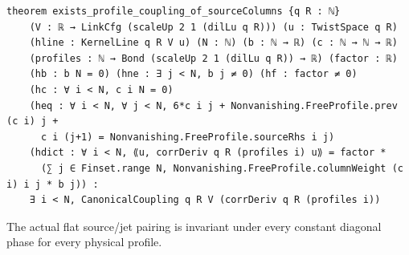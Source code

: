 \begin{theorem}[bp-329]
\begin{verbatim}
theorem exists_profile_coupling_of_sourceColumns {q R : ℕ}
    (V : ℝ → LinkCfg (scaleUp 2 1 (dilLu q R))) (u : TwistSpace q R)
    (hline : KernelLine q R V u) (N : ℕ) (b : ℕ → ℝ) (c : ℕ → ℕ → ℝ)
    (profiles : ℕ → Bond (scaleUp 2 1 (dilLu q R)) → ℝ) (factor : ℝ)
    (hb : b N = 0) (hne : ∃ j < N, b j ≠ 0) (hf : factor ≠ 0)
    (hc : ∀ i < N, c i N = 0)
    (heq : ∀ i < N, ∀ j < N, 6*c i j + Nonvanishing.FreeProfile.prev (c i) j +
      c i (j+1) = Nonvanishing.FreeProfile.sourceRhs i j)
    (hdict : ∀ i < N, ⟪u, corrDeriv q R (profiles i) u⟫ = factor *
      (∑ j ∈ Finset.range N, Nonvanishing.FreeProfile.columnWeight (c i) i j * b j)) :
    ∃ i < N, CanonicalCoupling q R V (corrDeriv q R (profiles i))
\end{verbatim}
\end{theorem}

\begin{theorem}[bp-330]
\label{bp-330}
\uses{}
\leanok
The actual flat source/jet pairing is invariant under every constant diagonal phase for every physical profile.


\end{theorem}
